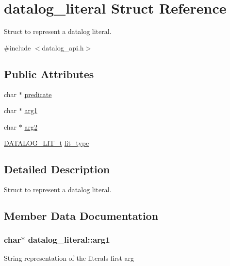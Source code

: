 \hypertarget{structdatalog__literal}{}\section{datalog\+\_\+literal Struct Reference}
\label{structdatalog__literal}


Struct to represent a datalog literal.  




{\ttfamily \#include $<$datalog\+\_\+api.\+h$>$}

\subsection*{Public Attributes}
\begin{DoxyCompactItemize}
\item 
char $\ast$ \hyperlink{structdatalog__literal_aad44475a0e606d9fd9c5e7aae3667412}{predicate}
\item 
char $\ast$ \hyperlink{structdatalog__literal_aac5aacf6ea0e280418cbf61b700a5239}{arg1}
\item 
char $\ast$ \hyperlink{structdatalog__literal_a38e9dc36488ad4014bfb52027cc65cc9}{arg2}
\item 
\hyperlink{datalog__api_8h_ad27ac7b01e9690a8c6d1bd37e131a421}{D\+A\+T\+A\+L\+O\+G\+\_\+\+L\+I\+T\+\_\+t} \hyperlink{structdatalog__literal_a7fad52c17a15a69937de4e78746be12c}{lit\+\_\+type}
\end{DoxyCompactItemize}


\subsection{Detailed Description}
Struct to represent a datalog literal. 

\subsection{Member Data Documentation}
\subsubsection[{\texorpdfstring{arg1}{arg1}}]{\setlength{\rightskip}{0pt plus 5cm}char$\ast$ datalog\+\_\+literal\+::arg1}\hypertarget{structdatalog__literal_aac5aacf6ea0e280418cbf61b700a5239}{}\label{structdatalog__literal_aac5aacf6ea0e280418cbf61b700a5239}
String representation of the literals first arg 

